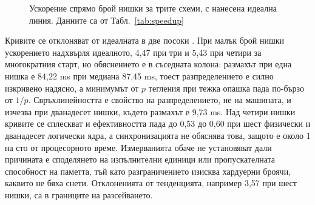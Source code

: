 \begin{figure}[htbp]
\centering
{}
\caption{Ускорение спрямо брой нишки за трите схеми, с нанесена идеална линия. Данните са от Табл.~\ref{tab:speedup}}
\label{fig:speedup}
\end{figure}

Кривите се отклоняват от идеалната в две посоки . При малък брой нишки
ускорението надхвърля идеалното, 4,47 при три и 5,43 при четири за многократния старт, но
обяснението е в съседната колона: размахът при една нишка е 84,22 ms при медиана 87,45 ms, тоест
разпределението е силно изкривено надясно, а минимумът от $p$ тегления при тежка опашка пада по-бързо
от $1/p$. Свръхлинейността е свойство на разпределението, не на машината, и изчезва при дванадесет
нишки, където размахът е 9,73 ms. Над четири нишки кривите се сплескват
и ефективността пада до 0,53 до 0,60 при шест физически и дванадесет логически ядра, а
синхронизацията не обяснява това, защото е около 1 на сто от процесорното време. Измерванията обаче не
установяват дали причината е споделянето на изпълнителни единици или пропускателната способност на
паметта, тъй като разграничението изисква хардуерни броячи, каквито не бяха снети. Отклоненията от
тенденцията, например 3,57 при шест нишки, са в границите на разсейването.

